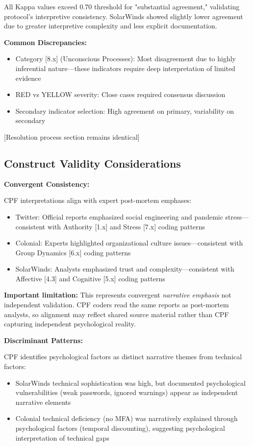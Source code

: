 \documentclass[11pt,a4paper]{article}
\begin{document}
\FloatBarrier

All Kappa values exceed 0.70 threshold for "substantial agreement," validating protocol's interpretive consistency. SolarWinds showed slightly lower agreement due to greater interpretive complexity and less explicit documentation.

\textbf{Common Discrepancies:}

\begin{itemize}
\item Category [8.x] (Unconscious Processes): Most disagreement due to highly inferential nature—these indicators require deep interpretation of limited evidence
\item RED vs YELLOW severity: Close cases required consensus discussion
\item Secondary indicator selection: High agreement on primary, variability on secondary
\end{itemize}

[Resolution process section remains identical]

\subsection{Construct Validity Considerations}

\textbf{Convergent Consistency:}

CPF interpretations align with expert post-mortem emphases:
\begin{itemize}
\item Twitter: Official reports emphasized social engineering and pandemic stress—consistent with Authority [1.x] and Stress [7.x] coding patterns
\item Colonial: Experts highlighted organizational culture issues—consistent with Group Dynamics [6.x] coding patterns
\item SolarWinds: Analysts emphasized trust and complexity—consistent with Affective [4.3] and Cognitive [5.x] coding patterns
\end{itemize}

\textbf{Important limitation:} This represents convergent \textit{narrative emphasis} not independent validation. CPF coders read the same reports as post-mortem analysts, so alignment may reflect shared source material rather than CPF capturing independent psychological reality.

\textbf{Discriminant Patterns:}

CPF identifies psychological factors as distinct narrative themes from technical factors:
\begin{itemize}
\item SolarWinds technical sophistication was high, but documented psychological vulnerabilities (weak passwords, ignored warnings) appear as independent narrative elements
\item Colonial technical deficiency (no MFA) was narratively explained through psychological factors (temporal discounting), suggesting psychological interpretation of technical gaps
\end{itemize}
\end{document}
